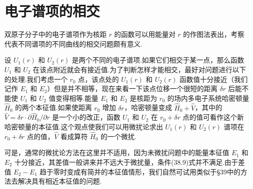 \section{电子谱项的相交}

双原子分子中的电子谱项作为核距 $r$ 的函数可以用能量对 $r$ 的作图法表出，考察代表不同谱项的不同曲线的相交问题颇有意义.

设 $U_1(r)$ 和 $U_2(r)$ 是两个不同的电子谱项.如果它们相交于某一点，那么函数 $U_1$ 和 $U_2$ 在该点附近就会有接近值.为了判断怎样才能相交，最好对问题进行以下的处理.我们考虑一个 $r_0$ 点，该点处的 $U_1(r)$ 和 $U_2(r)$ 函数值十分接近（我们记作 $E_1$ 和 $E_2$）但是并不相等，现在来看一下该点位移一个很短的距离 $\delta r$ 后能不能使 $U_1$ 和 $U_2$ 值变得相等.能量 $E_1$ 和 $E_2$ 是核距为 $r_0$ 的场内多电子系统哈密顿量 $\hat{H}_0$ 的两个本征值.如果使距离 $r_0$ 增加 $\delta r$，哈密顿量变成 $\hat{H}_0+\hat{V}$，其中的 $\hat{V}=\delta r\cdot\partial\hat{H}_0/\partial r$ 是一个小的改正，函数 $U_1$ 和 $U_2$ 在 $r_0+\delta r$ 点的值可看作这个新哈密顿量的本征值.这个观点使我们可以用微扰论求出 $U_1(r)$ 和 $U_2(r)$ 谱项在 $r_0+\delta r$ 点的值，$\hat{V}$ 看成算符 $\hat{H}_0$ 的一个微扰.

可是，通常的微扰论方法在这里并不适用，因为未微扰问题中的能量本征值 $E_1$ 和 $E_2$ 十分接近，其差值一般讲来并不远大于微扰量，条件(38.9)式并不满足.由于差值 $E_2-E_1$ 趋于零时变成有简并的本征值情形，我们自然可试用类似于§39中的方法去解决具有相近本征值的问题.

